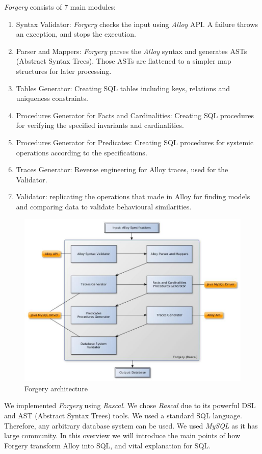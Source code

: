 \documentclass[oneside]{book}
\begin{document}
\textit{Forgery} consists of 7 main modules:
\begin{enumerate}
	\item Syntax Validator: \textit{Forgery} checks the input using \textit{Alloy} API. A failure throws an exception, and stops the execution.
	\item Parser and Mappers: \textit{Forgery} parses the \textit{Alloy} syntax and generates ASTs (Abstract Syntax Trees). Those ASTs are flattened to a simpler map structures for later processing.
	\item Tables Generator: Creating SQL tables including keys, relations and uniqueness constraints.
	\item Procedures Generator for Facts and Cardinalities: Creating SQL procedures for verifying the specified invariants and cardinalities. 
	\item Procedures Generator for Predicates: Creating SQL procedures for systemic operations according to the specifications.
	\item Traces Generator: Reverse engineering for Alloy traces, used for the Validator.
	\item Validator: replicating the operations that made in Alloy for finding models and comparing data to validate behavioural similarities.
\end{enumerate}

\newpage
\begin{figure}[h!]
\centering
\includegraphics[scale=0.45]{forgery}
\caption{Forgery architecture}
\end{figure}

We implemented \textit{Forgery} using \textit{Rascal}. We chose \textit{Rascal} due to its powerful DSL and AST (Abstract Syntax Trees) tools. We used a standard SQL language. Therefore, any arbitrary database system can be used. We used \textit{MySQL} as it has large community. In this overview we will introduce the main points of how Forgery transform Alloy into SQL, and vital explanation for SQL.
\end{document}
